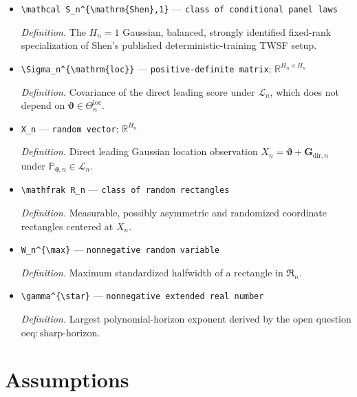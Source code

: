 \documentclass{article}
\begin{document}
\begin{itemize}
  \item \texttt{\textbackslash{}\allowbreak{}mathcal S\_\allowbreak{}n\textasciicircum{}\{\textbackslash{}\allowbreak{}mathrm\{Shen\}\allowbreak{},\allowbreak{}1\}\allowbreak{}} --- \texttt{class of conditional panel laws}
  \par\smallskip\noindent\emph{Definition.} The \(H_n=1\) Gaussian, balanced, strongly identified fixed-rank specialization of Shen's published deterministic-training TWSF setup.
  \item \texttt{\textbackslash{}\allowbreak{}Sigma\_\allowbreak{}n\textasciicircum{}\{\textbackslash{}\allowbreak{}mathrm\{loc\}\allowbreak{}\}\allowbreak{}} --- \texttt{positive-\allowbreak{}definite matrix}; \(\mathbb R^{H_n\times H_n}\)
  \par\smallskip\noindent\emph{Definition.} Covariance of the direct leading score under \(\mathcal L_n\), which does not depend on \(\boldsymbol\vartheta\in\Theta_n^{\mathrm{loc}}\).
  \item \texttt{X\_\allowbreak{}n} --- \texttt{random vector}; \(\mathbb R^{H_n}\)
  \par\smallskip\noindent\emph{Definition.} Direct leading Gaussian location observation \(X_n=\boldsymbol\vartheta+\boldsymbol G_{\mathrm{dir},n}\) under \(\mathbb P_{\boldsymbol\vartheta,n}\in\mathcal L_n\).
  \item \texttt{\textbackslash{}\allowbreak{}mathfrak R\_\allowbreak{}n} --- \texttt{class of random rectangles}
  \par\smallskip\noindent\emph{Definition.} Measurable, possibly asymmetric and randomized coordinate rectangles centered at \(X_n\).
  \item \texttt{W\_\allowbreak{}n\textasciicircum{}\{\textbackslash{}\allowbreak{}max\}\allowbreak{}} --- \texttt{nonnegative random variable}
  \par\smallskip\noindent\emph{Definition.} Maximum standardized halfwidth of a rectangle in \(\mathfrak R_n\).
  \item \texttt{\textbackslash{}\allowbreak{}gamma\textasciicircum{}\{\textbackslash{}\allowbreak{}star\}\allowbreak{}} --- \texttt{nonnegative extended real number}
  \par\smallskip\noindent\emph{Definition.} Largest polynomial-horizon exponent derived by the open question \(\mathrm{oeq{:}sharp\mbox{-}horizon}\).
\end{itemize}

\section{Assumptions}
\end{document}
